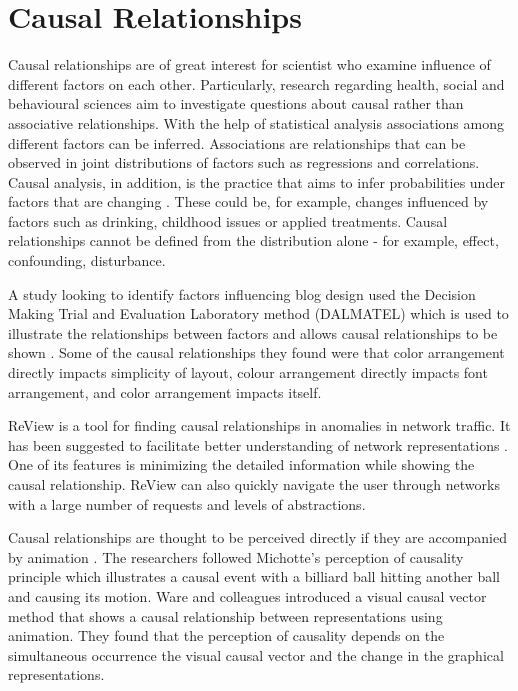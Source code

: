 \documentclass{l4proj}
\begin{document}
\section{Causal Relationships}

Causal relationships are of great interest for scientist who examine influence of different factors on each other. Particularly, research regarding health, social and behavioural sciences aim to investigate questions about causal rather than associative relationships. With the help of statistical analysis associations among different factors can be inferred. Associations are relationships that can be observed in joint distributions of factors such as regressions and correlations. Causal analysis, in addition, is the practice that aims to infer probabilities under factors that are changing \cite{pearl2010introduction}. These could be, for example, changes influenced by factors such as drinking, childhood issues or applied treatments. Causal relationships cannot be defined from the distribution alone - for example, effect, confounding, disturbance. 

A study looking to identify factors influencing blog design used the Decision Making Trial and Evaluation Laboratory method (DALMATEL) which is used to illustrate the relationships between factors and allows causal relationships to be shown \cite{hsu2012evaluation}. Some of the causal relationships they found were that color arrangement directly impacts simplicity of layout, colour arrangement directly impacts font arrangement, and color arrangement impacts itself. 

ReView is a tool for finding causal relationships in anomalies in network traffic. It has been suggested to facilitate better understanding of network representations \cite{Zhang:2015:VTC:2713579.2713583}. One of its features is minimizing the detailed information while showing the causal relationship. ReView can also quickly navigate the user through networks with a large number of requests and levels of abstractions.

Causal relationships are thought to be perceived directly if they are accompanied by animation \cite{ware1999visualizing}. The researchers followed Michotte's perception of causality principle which illustrates a causal event with a billiard ball hitting another ball and causing its motion. Ware and colleagues \cite{ware1999visualizing} introduced a visual causal vector method that shows a causal relationship between representations using animation. They found that the perception of causality depends on the simultaneous occurrence the visual causal vector and the change in the graphical representations. 
\end{document}
